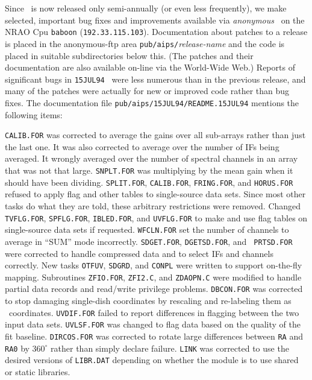 Since \AIPS\ is now released only semi-annually (or even less
frequently), we make selected, important bug fixes and improvements
available via {\it anonymous} \ftp\ on the NRAO Cpu {\tt baboon}
({\tt 192.33.115.103}).  Documentation about patches to a release is
placed in the anonymous-ftp area {\tt pub/aips/}{\it release-name} and
the code is placed in suitable subdirectories below this.
(The patches and their documentation are also available on-line via
the World-Wide Web.)  Reports of significant bugs in {\tt 15JUL94}
\AIPS\ were less numerous than in the previous release, and many of
the patches were actually for new or improved code rather than bug
fixes.  The documentation file {\tt pub/aips/15JUL94/README.15JUL94}
mentions the following items:
\begin{description}
\vspace{-8pt}
 {\tt CALIB.FOR} was corrected to average the gains over
   all sub-arrays rather than just the last one.  It was also
   corrected to average over the number of IFs being averaged.  It
   wrongly averaged over the number of spectral channels in an array
   that was not that large.  {\tt SNPLT.FOR} was multiplying by the
   mean gain when it should have been dividing.
 {\tt SPLIT.FOR}, {\tt CALIB.FOR}, {\tt FRING.FOR},
   and {\tt HORUS.FOR} refused to apply flag and other tables to
   single-source data sets.  Since most other tasks do what they are
   told, these arbitrary restrictions were removed.  Changed {\tt
   TVFLG.FOR}, {\tt SPFLG.FOR}, {\tt IBLED.FOR}, and {\tt UVFLG.FOR}
   to make and use flag tables on single-source data sets if
   requested.
 {\tt WFCLN.FOR} set the number of channels to average
   in ``SUM'' mode incorrectly.
 {\tt SDGET.FOR}, {\tt DGETSD.FOR}, and {\tt
   PRTSD.FOR} were corrected to handle compressed data and to select
   IFs and channels correctly.  New tasks {\tt OTFUV}, {\tt SDGRD},
   and {\tt CONPL} were written to support on-the-fly mapping.
   Subroutines {\tt ZFIO.FOR}, {\tt ZFI2.C}, and {\tt ZDAOPN.C} were
   modified to handle partial data records and read/write privilege
   problems.  {\tt DBCON.FOR} was corrected to stop damaging
   single-dish coordinates by rescaling and re-labeling them as \uv\
   coordinates.
 {\tt UVDIF.FOR} failed to report differences in
   flagging between the two input data sets.
 {\tt UVLSF.FOR} was changed to flag data based on the
   quality of the fit baseline.
 {\tt DIRCOS.FOR} was corrected to rotate large
   differences between {\tt RA} and {\tt RA0} by $360^{\circ}$ rather
   than simply declare failure.
 {\tt LINK} was corrected to use the desired versions
   of {\tt LIBR.DAT} depending on whether the module is to use shared
   or static libraries.
\end{description}
